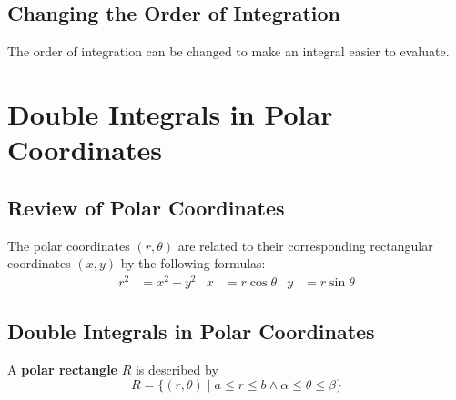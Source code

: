 \documentclass[../Calculus \Roman{3}.tex]{subfiles}
\begin{document}
		\subsection*{Changing the Order of Integration}
			The order of integration can be changed to make an integral easier to evaluate.
	\section{Double Integrals in Polar Coordinates}
		\subsection*{Review of Polar Coordinates}
			The polar coordinates $(r, \theta)$ are related to their corresponding rectangular coordinates $(x, y)$ by the following formulas:
			\begin{align*}
				r^2 &= x^2 + y^2 &
						x &= r\cos\theta &
						y &= r\sin\theta
			\end{align*}
		\subsection*{Double Integrals in Polar Coordinates}
				A \textbf{polar rectangle} $R$ is described by
					\[R = \{(r, \theta) \mid a \le r \le b \land \alpha \le \theta \le \beta\}\]
\end{document}
